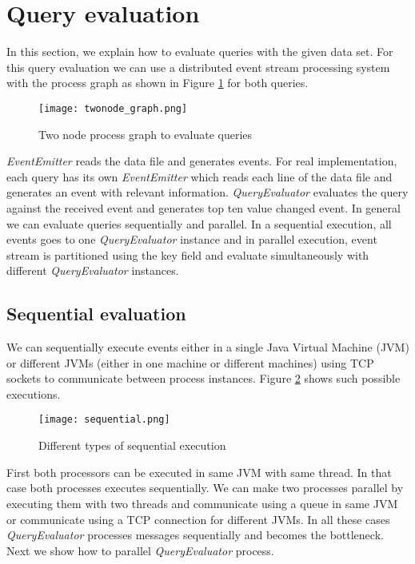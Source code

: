 \section{Query evaluation}

In this section, we explain how to evaluate queries with the given data set. For this query evaluation we can use a distributed event stream processing system with the process graph as shown in Figure \ref{twonode_graph} for both queries.

\begin{figure}[!t]
        \centering
        \texttt{[image: twonode\_graph.png]}
        \caption{Two node process graph to evaluate queries}
        \label{twonode_graph}
\end{figure}

\textit{EventEmitter} reads the data file and generates events. For real implementation, each query has its own \textit{EventEmitter} which reads each line of the data file and generates an event with relevant information. \textit{QueryEvaluator} evaluates the query against the received event and generates top ten value changed event.  In general we can evaluate queries sequentially and parallel. In a sequential execution, all events goes to one \textit{QueryEvaluator} instance and in parallel execution, event stream is partitioned using the key field and evaluate simultaneously with different \textit{QueryEvaluator} instances.

\subsection{Sequential evaluation}

We can sequentially execute events either in a single Java Virtual Machine (JVM) or different JVMs (either in one machine or different machines) using TCP sockets to communicate between process instances. Figure \ref{sequential} shows such possible executions. 

\begin{figure}[!t]
        \centering
        \texttt{[image: sequential.png]}
        \caption{Different types of sequential execution}
        \label{sequential}
\end{figure}

First both processors can be executed in same JVM with same thread. In that case both processes executes sequentially. We can make two processes parallel by executing them with two threads and communicate using a queue in same JVM or communicate using a TCP connection for different JVMs. In all these cases \textit{QueryEvaluator} processes messages sequentially and becomes the bottleneck. Next we show how to parallel \textit{QueryEvaluator} process. 


